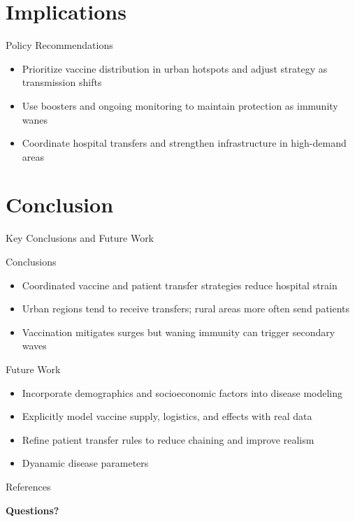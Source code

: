\documentclass[aspectratio=169,xcolor=dvipsnames]{beamer}
\begin{document}
\section{Implications}
\begin{frame}{Policy Recommendations}
    \begin{itemize}
        \item Prioritize vaccine distribution in urban hotspots and adjust strategy as transmission shifts
        \item Use boosters and ongoing monitoring to maintain protection as immunity wanes
        \item Coordinate hospital transfers and strengthen infrastructure in  high-demand areas
    \end{itemize}
    
\end{frame}

\section{Conclusion}
\begin{frame}{Key Conclusions and Future Work}
    \begin{minipage}[t]{0.48\textwidth}
        \begin{block}{Conclusions}
            \begin{itemize}
                \item Coordinated vaccine and patient transfer strategies reduce hospital strain
                \item Urban regions tend to receive transfers; rural areas more often send patients
                \item Vaccination mitigates surges but waning immunity can trigger secondary waves
            \end{itemize}
        \end{block}
    \end{minipage}
    \hfill
    \begin{minipage}[t]{0.48\textwidth}
        \begin{block}{Future Work}
            \begin{itemize}
                \item Incorporate demographics and socioeconomic factors into disease modeling
                \item Explicitly model vaccine supply, logistics, and effects with real data
                \item Refine patient transfer rules to reduce chaining and improve realism
                \item Dyanamic disease parameters
            \end{itemize}
        \end{block}
    \end{minipage}
 \end{frame}
    

\begin{frame}[allowframebreaks]{References}
    \tiny
    
    
\end{frame}
 
\begin{frame}
    \Huge{\centerline{\textbf{Questions?}}}
\end{frame}
\end{document}
